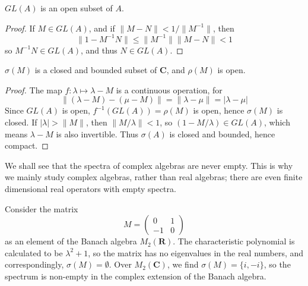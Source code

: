 \begin{corollary}
    $GL(A)$ is an open subset of $A$.
\end{corollary}
\begin{proof}
    If $M \in GL(A)$, and if $\| M - N \| < 1/\| M^{-1} \|$, then 
    \[ \| 1 - M^{-1}N \| \leq \| M^{-1} \| \| M - N \|  < 1 \]
    so $M^{-1}N \in GL(A)$, and thus $N \in GL(A)$.
\end{proof}

\begin{corollary}
    $\sigma(M)$ is a closed and bounded subset of $\mathbf{C}$, and $\rho(M)$ is open.
\end{corollary}
\begin{proof}
    The map $f: \lambda \mapsto \lambda - M$ is a continuous operation, for
    \[ \| (\lambda - M) - (\mu - M) \| = \| \lambda - \mu \| = | \lambda - \mu | \]
    Since $GL(A)$ is open, $f^{-1}(GL(A)) = \rho(M)$ is open, hence $\sigma(M)$ is closed. If $|\lambda| > \|M\|$, then $\| M/\lambda \| < 1$, so $(1 - M/\lambda) \in GL(A)$, which means $\lambda - M$ is also invertible. Thus $\sigma(A)$ is closed and bounded, hence compact.
\end{proof}

We shall see that the spectra of complex algebras are never empty. This is why we mainly study complex algebras, rather than real algebras; there are even finite dimensional real operators with empty spectra.

\begin{example}
    Consider the matrix
    \[ M = \begin{pmatrix} 0 & 1 \\ -1 & 0 \end{pmatrix} \]
    as an element of the Banach algebra $M_2(\mathbf{R})$. The characteristic polynomial is calculated to be $\lambda^2 + 1$, so the matrix has no eigenvalues in the real numbers, and correspondingly, $\sigma(M) = \emptyset$. Over $M_2(\mathbf{C})$, we find $\sigma(M) = \{ i, -i \}$, so the spectrum is non-empty in the complex extension of the Banach algebra.
\end{example}

